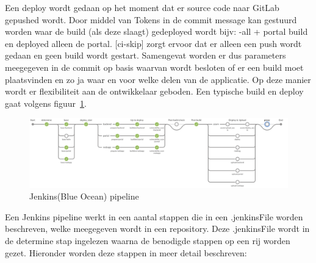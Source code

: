 Een deploy wordt gedaan op het moment dat er source code naar GitLab gepushed wordt. Door middel van Tokens in de commit message kan gestuurd worden waar de build (als deze slaagt) gedeployed wordt bijv: {-all + portal} build en deployed alleen de portal. [ci-skip] zorgt ervoor dat er alleen een push wordt gedaan en geen build wordt gestart.
Samengevat worden er dus parameters meegegeven in de commit op basis waarvan wordt besloten of er een build moet plaatsvinden en zo ja waar en voor welke delen van de applicatie. Op deze manier wordt er flexibiliteit aan de ontwikkelaar geboden. Een typische build en deploy gaat volgens figuur~\ref{fig:JenkinsPipeLine}.

\begin{figure}
    \myfloatalign
    \includegraphics[width=12cm]{gfx/Screenshot 2021-08-18 Jenkins PipeLine}
    \caption{Jenkins(Blue Ocean) pipeline}
    \label{fig:JenkinsPipeLine}
\end{figure}
Een Jenkins pipeline werkt in een aantal stappen die in een .jenkinsFile worden beschreven, welke meegegeven wordt in een repository. Deze .jenkinsFile wordt in de determine stap ingelezen waarna de benodigde stappen op een rij worden gezet. Hieronder worden deze stappen in meer detail beschreven:
